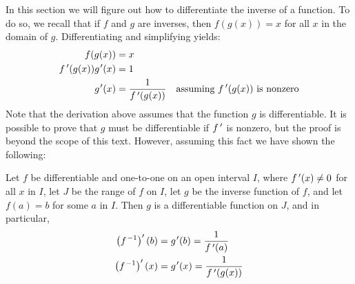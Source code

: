 %
%		

In this section we will figure out how to differentiate the inverse of a function. To do so, we recall that if $f$ and $g$ are inverses, then $f(g(x))=x$ for all $x$ in the domain of $g$. Differentiating and simplifying yields:
\begin{align*}
f(g(x))&=x\\
\fp(g(x))g\primeskip'(x)&=1\\
g\primeskip'(x)&=\frac 1{\fp(g(x))} \quad\text{assuming $\fp(g(x))$ is nonzero}
\end{align*}
Note that the derivation above assumes that the function $g$ is differentiable. It is possible to prove that $g$ must be differentiable if $f\,'$ is nonzero, but the proof is beyond the scope of this text. However, assuming this fact we have shown the following:

\begin{theorem}\label{thm:deriv_inverse_functions}%
Let $f$ be differentiable and one-to-one on an open interval $I$, where $f\,'(x) \neq 0$ for all $x$ in $I$, let $J$ be the range of $f$ on $I$, let $g$ be the inverse function of $f$, and let $f(a) = b$ for some $a$ in $I$. Then $g$ is a differentiable function on $J$, and in particular,
\begin{align*}
 \left(f\primeskip^{-1}\right)'(b) &=g\primeskip'(b) = \frac{1}{\fp(a)} \\
 \left(f\primeskip^{-1}\right)'(x) &=g\primeskip'(x) = \frac{1}{\fp(g(x))}
\end{align*}
\end{theorem}

